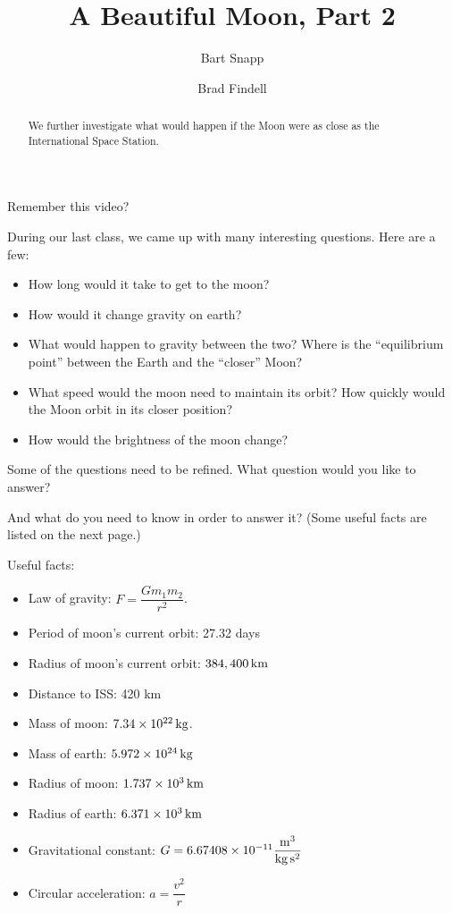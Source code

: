 \documentclass{ximera}
\title{A Beautiful Moon, Part 2}
\author{Bart Snapp \and Brad Findell}
\begin{document}
\begin{abstract}
We further investigate what would happen if the Moon were as close as the
International Space Station.
\end{abstract}
\maketitle
Remember this video?  

\begin{problem}
 During our last class, we came up with many interesting questions.   Here are a few:

\begin{itemize}
\item How long would it take to get to the moon? 
\item How would it change gravity on earth? 
\item What would happen to gravity between the two?     Where is the ``equilibrium point'' between the
   Earth and the ``closer'' Moon?
\item What speed would the moon need to maintain its orbit?   How quickly would the Moon orbit in its closer position?
\item  How would the brightness of the moon change?
 \end{itemize}

Some of the questions need to be refined.  What question would you like to answer?  

And what do you need to know in order to answer it?  (Some useful facts are listed on the next page.)  

\newpage
Useful facts:   
 
\begin{itemize}
\item Law of gravity:  $F=\dfrac{Gm_1m_2}{r^2}$.
\item Period of moon's current orbit:  27.32 days
\item Radius of moon's current orbit:  $384,400 \, \rm{km}$
\item Distance to ISS: 420 km
\item Mass of moon: $7.34\times 10^{22}\, \rm{kg}$.
\item Mass of earth: $5.972\times 10^{24}\, \rm{kg}$
\item Radius of moon: $1.737\times 10^3\, \rm{km}$
\item Radius of earth: $6.371\times 10^3\, \rm{km}$
\item Gravitational constant:  $G = 6.67408\times 10^{-11} \dfrac{\rm{m}^3}{ \rm{kg} \, \rm{ s}^2}$
\item Circular acceleration: $a=\dfrac{v^2}{r}$
\end{itemize}
 
\end{problem}
\end{document}

